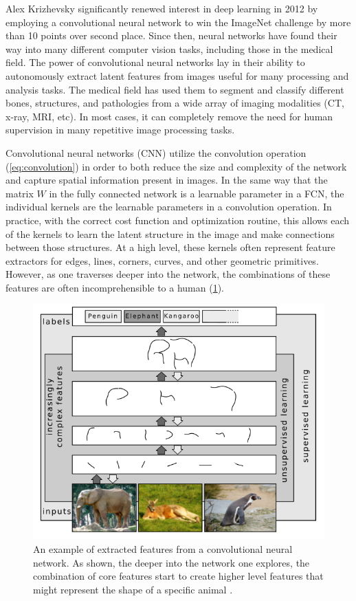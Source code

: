 Alex Krizhevsky significantly renewed interest in deep learning in 2012 by employing a convolutional neural network to win the ImageNet challenge \cite{russakovskyImageNetLargeScale2015} by more than 10 points over second place.
Since then, neural networks have found their way into many different computer vision tasks, including those in the medical field.
The power of convolutional neural networks lay in their ability to autonomously extract latent features from images useful for many processing and analysis tasks.
The medical field has used them to segment and classify different bones, structures, and pathologies from a wide array of imaging modalities (CT, x-ray, MRI, etc).
In most cases, it can completely remove the need for human supervision in many repetitive image processing tasks.

Convolutional neural networks (CNN) utilize the convolution operation (\cref{eq:convolution}) in order to both reduce the size and complexity of the network and capture spatial information present in images.
In the same way that the matrix $W$ in the fully connected network is a learnable parameter in a FCN, the individual kernels are the learnable parameters in a convolution operation.
In practice, with the correct cost function and optimization routine, this allows each of the kernels to learn the latent structure in the image and make connections between those structures.
At a high level, these kernels often represent feature extractors for edges, lines, corners, curves, and other geometric primitives.
However, as one traverses deeper into the network, the combinations of these features are often incomprehensible to a human (\cref{fig:conv-layers}).

\begin{figure}[h!]
    \centering
    \includegraphics[width=0.7\linewidth]{figs/background/png/conv-layers.png}
    \caption[An example of extracted features from a convolutional neural network]{An example of extracted features from a convolutional neural network. As shown, the deeper into the network one explores, the combination of core features start to create higher level features that might represent the shape of a specific animal \cite{schulzDeepLearningLayerWise2012}.}
    \label{fig:conv-layers}
\end{figure}

